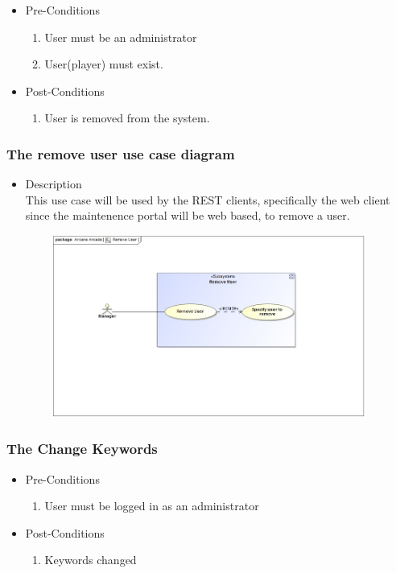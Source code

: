 \documentclass[english]{article}
\begin{document}
			\begin{itemize}
	
		
		\item Pre-Conditions
			\begin{enumerate}
				\item User must be an administrator
				\item User(player) must exist.
			\end{enumerate}
		\item Post-Conditions
			\begin{enumerate}
			\item User is removed from the system.
						
			\end{enumerate}
	

		\end{itemize}
		
		
		\subsubsection* {The remove user use case diagram}
		\begin{itemize}
			\item Description\\
			This use case will be used by the REST clients, specifically the web client since the maintenence 					portal will be web based, to remove a user.
		\end{itemize}
		
	
		\includegraphics[width=14cm,height=6cm,keepaspectratio]{removeUser.jpg}
		
				
		
		\subsubsection{The Change Keywords}
		
			\begin{itemize}
	
		
		\item Pre-Conditions
			\begin{enumerate}
				\item User must be logged in as an administrator
			\end{enumerate}
		\item Post-Conditions
			\begin{enumerate}
			\item Keywords changed
						
			\end{enumerate}
		

		\end{itemize}
		
\end{document}
